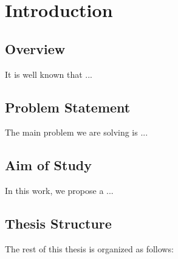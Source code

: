 \chapter{Introduction} 
\label{Chapter1} 

\section{Overview}
It is well known that ...

\section{Problem Statement}
The main problem we are solving is ...

\section{Aim of Study}
In this work, we propose a ...


\section{Thesis Structure}
The rest of this thesis is organized as follows: 